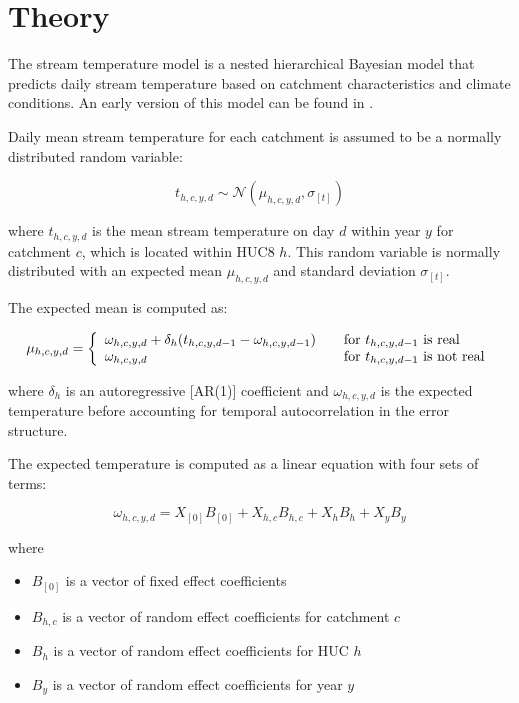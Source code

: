 \documentclass[
]{book}
\providecommand{\tightlist}{%
  \setlength{\itemsep}{0pt}\setlength{\parskip}{0pt}}
\begin{document}
\chapter{Theory}\label{theory}

The stream temperature model is a nested hierarchical Bayesian model that predicts daily stream temperature based on catchment characteristics and climate conditions. An early version of this model can be found in \citet{Letcher2016}.

Daily mean stream temperature for each catchment is assumed to be a normally distributed random variable:

\[t_{h,c,y,d} \sim \mathcal{N}(\mu_{h,c,y,d},\sigma_{[t]})\]

where \(t_{h,c,y,d}\) is the mean stream temperature on day \(d\) within year \(y\) for catchment \(c\), which is located within HUC8 \(h\). This random variable is normally distributed with an expected mean \(\mu_{h,c,y,d}\) and standard deviation \(\sigma_{[t]}\).

The expected mean is computed as:

\[
\mu_{h,c,y,d} = \left \{ \begin{array}{l l}
  \omega_{h,c,y,d} + \delta_{h}(t_{h,c,y,d-1} - \omega_{h,c,y,d-1}) & \quad \text{for } t_{h,c,y,d-1} \text{ is real} \\
  \omega_{h,c,y,d} & \quad \text{for } t_{h,c,y,d-1} \text{ is not real}
  \end{array} \right.
\]

where \(\delta_h\) is an autoregressive {[}AR(1){]} coefficient and \(\omega_{h,c,y,d}\) is the expected temperature before accounting for temporal autocorrelation in the error structure.

The expected temperature is computed as a linear equation with four sets of terms:

\[\omega_{h,c,y,d} = X_{[0]} B_{[0]} + X_{h,c} B_{h,c} + X_{h} B_{h} + X_{y} B_{y}\]

where

\begin{itemize}
\tightlist
\item
  \(B_{[0]}\) is a vector of fixed effect coefficients
\item
  \(B_{h,c}\) is a vector of random effect coefficients for catchment \(c\)
\item
  \(B_{h}\) is a vector of random effect coefficients for HUC \(h\)
\item
  \(B_{y}\) is a vector of random effect coefficients for year \(y\)
\end{itemize}
\end{document}
